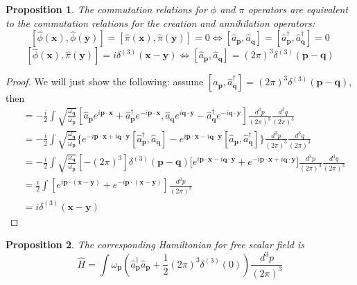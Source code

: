 \documentclass[a4paper]{article}
\theoremstyle{new}
\newtheorem{prop}{Proposition}[section]
\begin{document}
\begin{prop}
The commutation relations for $\phi$ and $\pi$ operators are equivalent to the commutation relations for the creation and annihilation operators:
$$[\hat{\phi}(\mathbf{x}),\hat{\phi}(\mathbf{y})]=[\hat{\pi}(\mathbf{x}),\hat{\pi}(\mathbf{y})]=0\iff[\hat{a}_{\mathbf{p}},\hat{a}_{\mathbf{q}}]=[\hat{a}_{\mathbf{p}}^\dag,\hat{a}_{\mathbf{q}}^\dag]=0$$
$$[\hat{\phi}(\mathbf{x}),\hat{\pi}(\mathbf{y})]=i\delta^{(3)}(\mathbf{x}-\mathbf{y})\iff[\hat{a}_{\mathbf{p}},\hat{a}_{\mathbf{q}}]=(2\pi)^3\delta^{(3)}(\mathbf{p}-\mathbf{q})$$
\end{prop}
\begin{proof}
We will just show the following: assume $[\hat{a}_{\mathbf{p}},\hat{a}_{\mathbf{q}}^\dag]=(2\pi)^3\delta^{(3)}(\mathbf{p}-\mathbf{q})$, then
\begin{align}
    [\hat{\phi}(\mathbf{x}),\hat{\pi}(\mathbf{y})]&=-\frac{i}{2}\int\sqrt{\frac{\omega_{\mathbf{q}}}{\omega_{\mathbf{p}}}}[\hat{a}_{\mathbf{p}}e^{i\mathbf{p}\cdot\mathbf{x}}+\hat{a}_{\mathbf{p}}^\dag e^{-i\mathbf{p}\cdot\mathbf{x}},\hat{a}_{\mathbf{q}}e^{i\mathbf{q}\cdot\mathbf{y}}-\hat{a}_{\mathbf{q}}^\dag e^{-i\mathbf{q}\cdot\mathbf{y}}]\frac{d^3p}{(2\pi)^3}\frac{d^3q}{(2\pi)^3}\nonumber\\
    &=-\frac{i}{2}\int\sqrt{\frac{\omega_{\mathbf{q}}}{\omega_{\mathbf{p}}}}\bigg\{e^{-i\mathbf{p}\cdot\mathbf{x}+i\mathbf{q}\cdot\mathbf{y}}[\hat{a}_{\mathbf{p}}^\dag,\hat{a}_{\mathbf{q}}]-e^{i\mathbf{p}\cdot\mathbf{x}-i\mathbf{q}\cdot\mathbf{y}}[\hat{a}_{\mathbf{p}},\hat{a}_{\mathbf{q}}^\dag]\bigg\}\frac{d^3p}{(2\pi)^3}\frac{d^3q}{(2\pi)^3}\nonumber\\
    &=-\frac{i}{2}\int\sqrt{\frac{\omega_{\mathbf{q}}}{\omega_{\mathbf{p}}}}[-(2\pi)^3]\delta^{(3)}(\mathbf{p}-\mathbf{q})\bigg[e^{i\mathbf{p}\cdot\mathbf{x}-i\mathbf{q}\cdot\mathbf{y}}+e^{-i\mathbf{p}\cdot\mathbf{x}+i\mathbf{q}\cdot\mathbf{y}}\bigg]\frac{d^3p}{(2\pi)^3}\frac{d^3q}{(2\pi)^3}\nonumber\\
    &=\frac{i}{2}\int[e^{i\mathbf{p}\cdot(\mathbf{x}-\mathbf{y})}+e^{-i\mathbf{p}\cdot(\mathbf{x}-\mathbf{y})}]\frac{d^3p}{(2\pi)^3}\nonumber\\
    &=i\delta^{(3)}(\mathbf{x}-\mathbf{y})\nonumber
\end{align}
\end{proof}
\begin{prop}
The corresponding Hamiltonian for free scalar field is 
$$\hat{H}=\int\omega_{\mathbf{p}}(\hat{a}_{\mathbf{p}}^\dag\hat{a}_{\mathbf{p}}+\frac{1}{2}(2\pi)^3\delta^{(3)}(0))\frac{d^3p}{(2\pi)^3}$$
\end{prop}
\end{document}
